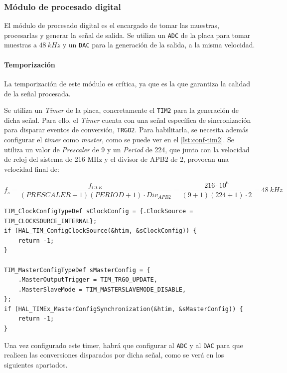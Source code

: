 \subsubsection{Módulo de procesado digital}

El módulo de procesado digital es el encargado de tomar las muestras, procesarlas y generar la señal de salida. Se utiliza un \texttt{ADC} de la placa para tomar muestras a $48\ kHz$ y un \texttt{DAC} para la generación de la salida, a la misma velocidad.

\paragraph{Temporización}

La temporización de este módulo es crítica, ya que es la que garantiza la calidad de la señal procesada. 

Se utiliza un \textit{Timer} de la placa, concretamente el \texttt{TIM2} para la generación de dicha señal. Para ello, el \textit{Timer} cuenta con una señal específica de sincronización para disparar eventos de conversión, \texttt{TRGO2}. Para habilitarla, se necesita además configurar el \textit{timer} como \textit{master}, como se puede ver en el \autoref{lst:conf-tim2}. Se utiliza un valor de \textit{Prescaler} de 9 y un \textit{Period} de 224, que junto con la velocidad de reloj del sistema de 216 MHz y el divisor de APB2 de 2, provocan una velocidad final de: 

\[
    f_s = \frac{f_{CLK}}{(PRESCALER + 1)(PERIOD + 1)\cdot Div_{APB2}} = \frac{216\cdot 10^6}{(9 + 1)(224 + 1)\cdot 2} = 48\ kHz
\]

\begin{lstlisting}[captionpos=t, caption={Configuración del TRGO del \textit{timer} de sincronización}]
TIM_ClockConfigTypeDef sClockConfig = {.ClockSource = TIM_CLOCKSOURCE_INTERNAL};
if (HAL_TIM_ConfigClockSource(&htim, &sClockConfig)) {
    return -1;
}

TIM_MasterConfigTypeDef sMasterConfig = {
    .MasterOutputTrigger = TIM_TRGO_UPDATE,
    .MasterSlaveMode = TIM_MASTERSLAVEMODE_DISABLE,
};
if (HAL_TIMEx_MasterConfigSynchronization(&htim, &sMasterConfig)) {
    return -1;
}
\end{lstlisting}

Una vez configurado este timer, habrá que configurar al \texttt{ADC} y al \texttt{DAC} para que realicen las conversiones disparados por dicha señal, como se verá en los siguientes apartados.


